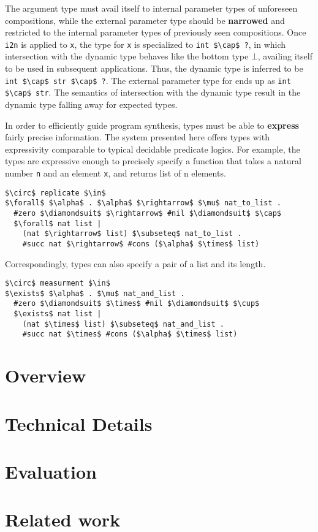 \documentclass[sigplan,screen]{acmart}
\begin{document}
The argument type must avail itself to internal parameter types of unforeseen compositions,
while the external parameter type should be \textbf{narrowed} and restricted 
to the internal parameter types of previously seen compositions.
Once \lstinline{i2n} is applied to \lstinline{x}, 
the type for \lstinline{x} is specialized to \lstinline{int $\cap$ ?}, 
in which intersection with the dynamic type behaves like the bottom type $\bot$,
availing itself to be used in subsequent applications. 
Thus, the dynamic type is inferred to be \lstinline{int $\cap$ str $\cap$ ?}.
The external parameter type for ends up as \lstinline{int $\cap$ str}. 
The semantics of intersection with the dynamic type result in the dynamic type
falling away for expected types.



In order to efficiently guide program synthesis, 
types must be able to \textbf{express} fairly precise information. 
The system presented here offers types with 
expressivity comparable to typical decidable predicate logics. 
For example, the types are expressive enough to precisely specify
a function that takes a natural number \lstinline{n} 
and an element \lstinline{x}, 
and returns list of n elements.

\begin{lstlisting}[]
$\circ$ replicate $\in$ 
$\forall$ $\alpha$ . $\alpha$ $\rightarrow$ $\mu$ nat_to_list .
  #zero $\diamondsuit$ $\rightarrow$ #nil $\diamondsuit$ $\cap$ 
  $\forall$ nat list | 
    (nat $\rightarrow$ list) $\subseteq$ nat_to_list .
    #succ nat $\rightarrow$ #cons ($\alpha$ $\times$ list)
\end{lstlisting}

\noindent Correspondingly, types can also specify a pair of a list and its length.

\begin{lstlisting}[]
$\circ$ measurment $\in$ 
$\exists$ $\alpha$ . $\mu$ nat_and_list .
  #zero $\diamondsuit$ $\times$ #nil $\diamondsuit$ $\cup$ 
  $\exists$ nat list | 
    (nat $\times$ list) $\subseteq$ nat_and_list .
    #succ nat $\times$ #cons ($\alpha$ $\times$ list)
\end{lstlisting}



\section{Overview}

\section{Technical Details}

\section{Evaluation}

\section{Related work}

\end{document}
